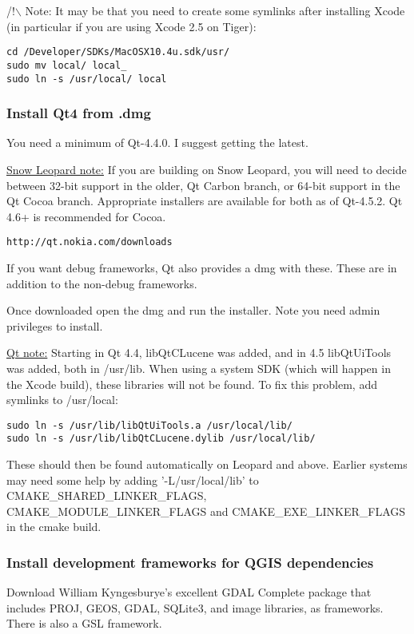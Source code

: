 /!$\backslash$ Note: It may be that you need to create some symlinks after installing 
Xcode (in particular if you are using Xcode 2.5 on Tiger):

\begin{verbatim}
cd /Developer/SDKs/MacOSX10.4u.sdk/usr/
sudo mv local/ local_
sudo ln -s /usr/local/ local
\end{verbatim}

\hypertarget{toc24}{}
\subsubsection{Install Qt4 from .dmg}
You need a minimum of Qt-4.4.0. I suggest getting the latest.

\underline{Snow Leopard note:} If you are building on Snow Leopard, you will need to
decide between 32-bit support in the older, Qt Carbon branch, or 64-bit
support in the Qt Cocoa branch. Appropriate installers are available for both
as of Qt-4.5.2.  Qt 4.6+ is recommended for Cocoa.

\begin{verbatim}
http://qt.nokia.com/downloads
\end{verbatim}

If you want debug frameworks, Qt also provides a dmg with these.  These are in
addition to the non-debug frameworks.

Once downloaded open the dmg and run the installer. Note you need admin
privileges to install.

\underline{Qt note:} Starting in Qt 4.4, libQtCLucene was added, and in 4.5
libQtUiTools was added, both in /usr/lib.  When using a system SDK (which will
happen in the Xcode build), these libraries will not be found.  To fix this problem,
add symlinks to /usr/local:

\begin{verbatim}
sudo ln -s /usr/lib/libQtUiTools.a /usr/local/lib/
sudo ln -s /usr/lib/libQtCLucene.dylib /usr/local/lib/
\end{verbatim}

These should then be found automatically on Leopard and above.  Earlier systems
may need some help by adding '-L/usr/local/lib' to CMAKE\_SHARED\_LINKER\_FLAGS,
CMAKE\_MODULE\_LINKER\_FLAGS and CMAKE\_EXE\_LINKER\_FLAGS in the cmake build.

\hypertarget{toc25}{}
\subsubsection{Install development frameworks for QGIS dependencies}
Download William Kyngesburye's excellent GDAL Complete package that includes
PROJ, GEOS, GDAL, SQLite3, and image libraries, as frameworks.  There is also
a GSL framework.

